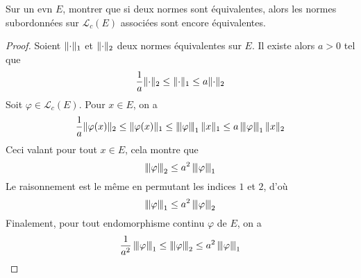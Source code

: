 \documentclass[10pt]{scrartcl}
\begin{document}
    \begin{exo}
        Sur un evn $E$, montrer que si deux normes sont équivalentes, alors les normes subordonnées sur $\mathcal L_c(E)$ associées sont encore équivalentes.
    \end{exo}

    \begin{proof}
        Soient $\lVert \cdot\rVert_1$ et $\lVert \cdot\rVert_2$ deux normes équivalentes sur $E$. 
        Il existe alors $a>0$ tel que 
        \[
            \frac1a\lVert \cdot\rVert_2\leq \lVert \cdot\rVert_1\leq a\lVert \cdot\rVert_2
        \]
        Soit $\varphi\in\mathcal L_c(E)$. Pour $x\in E$, on a 
        \[
            \frac1a\lVert \varphi(x)\rVert_2\leq\lVert \varphi(x)\rVert_1\leq\left|\hskip-.12em\lVert \varphi\rVert\hskip-.12em\right|_1\lVert x\rVert_1\leq a\left|\hskip-.12em\lVert \varphi\rVert\hskip-.12em\right|_1\lVert x\rVert_2
        \]
        Ceci valant pour tout $x\in E$, cela montre que 
        \[
            \left|\hskip-.12em\lVert \varphi\rVert\hskip-.12em\right|_2\leq a^2\left|\hskip-.12em\lVert \varphi\rVert\hskip-.12em\right|_1
        \]
        Le raisonnement est le même en permutant les indices $1$ et $2$, d'où
        \[
            \left|\hskip-.12em\lVert \varphi\rVert\hskip-.12em\right|_1\leq a^2\left|\hskip-.12em\lVert \varphi\rVert\hskip-.12em\right|_2
        \]
        Finalement, pour tout endomorphisme continu $\varphi$ de $E$, on a 
        \[
            \frac1{a^2}\left|\hskip-.12em\lVert \varphi\rVert\hskip-.12em\right|_1\leq\left|\hskip-.12em\lVert \varphi\rVert\hskip-.12em\right|_2\leq a^2\left|\hskip-.12em\lVert \varphi\rVert\hskip-.12em\right|_1
        \]
    \end{proof}
\end{document}
